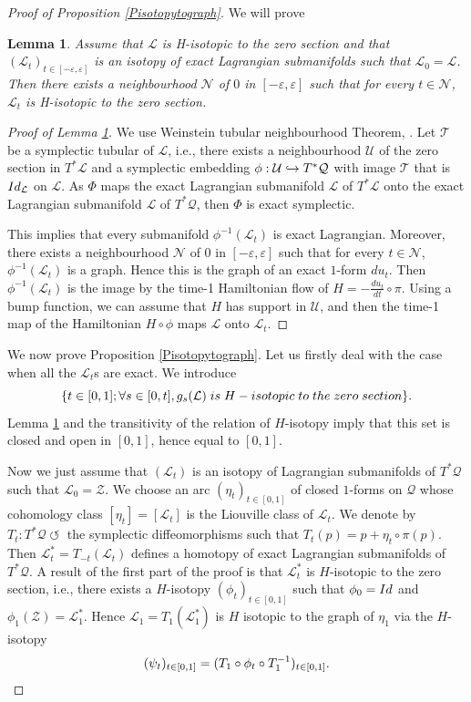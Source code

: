 \documentclass[11pt]{article}
\newcommand{\ie}{i.e.,\xspace}
\numberwithin{equation}{section}
\numberwithin{figure}{section}
\numberwithin{table}{section}
\def\hto{\mathrel{\lhook\joinrel\to}}
\providecommand{\righttoleftarrow}{\mathrel{\circlearrowleft}}
\newtheorem{lemma}{Lemma}
\theoremstyle{definition}
\def\cL{{\mathcal L}}
\def\cN{{\mathcal N}}
\def\cQ{{\mathcal Q}}
\def\cT{{\mathcal T}}
\def\cU{{\mathcal U}}
\def\cZ{{\mathcal Z}}
\begin{document}
\begin{proof}[Proof of Proposition \ref{Pisotopytograph}]
We will prove
\begin{lemma}\label{Lisotexactlagr}
Assume that $\cL$ is H-isotopic to the zero section and that $(\cL_t)_{t\in[-\varepsilon, \varepsilon]}$ is an isotopy of exact Lagrangian submanifolds such that $\cL_0=\cL$. Then there exists a neighbourhood $\cN$ of $0$ in $[-\varepsilon, \varepsilon]$ such that for every $t\in\cN$, $\cL_t$ is H-isotopic to the zero section.
\end{lemma}

\begin{proof}[Proof of Lemma \ref{Lisotexactlagr}]
We use Weinstein tubular neighbourhood Theorem, \cite{Weinstein1977}. Let $\cT$ be a symplectic tubular of $\cL$, \ie there exists a neighbourhood $\cU$ of the zero section in $T^*\cL$ and a symplectic embedding $\phi:\cU \hto T^*\cQ$ with image $\cT$ that is ${\rm Id}_{\cL}$ on $\cL$. As $\Phi$ maps the exact Lagrangian submanifold $\cL$ of $T^*\cL$ onto the exact Lagrangian submanifold $\cL$ of $T^*\cQ$, then $\Phi$ is exact symplectic.

This implies that every submanifold $\phi^{-1}(\cL_t)$ is exact Lagrangian. Moreover, there exists a neighbourhood $\cN$ of $0$ in $[-\varepsilon, \varepsilon]$ such that for every $t\in\cN$, $\phi^{-1}(\cL_t)$ is a graph. Hence this is the graph of an exact $1$-form $du_t$. Then $\phi^{-1}(\cL_t)$ is the image by the time-1 Hamiltonian flow of $H=-\frac{du_t}{dt}\circ \pi$. Using a bump function, we can assume that $H$ has support in $\cU$, and then the time-1 map of the Hamiltonian $H\circ\phi$ maps $\cL$ onto $\cL_t$.
\end{proof}

We now prove Proposition \ref{Pisotopytograph}. Let us firstly deal with the case when all the $\cL_t$s are exact. We introduce
\[
\{ t\in[0, 1]; \forall s\in [0, t], g_s(\cL)\;{\rm is}\; H-{\rm isotopic}\;{\rm to}\;{\rm the}\;{\rm zero}\;{\rm section}\}.
\]
Lemma \ref{Lisotexactlagr} and the transitivity of the relation of $H$-isotopy imply that this set is closed and open in $[0, 1]$, hence equal to $[0,1]$.

Now we just assume that $(\cL_t)$ is an isotopy of Lagrangian submanifolds of $T^*\cQ$ such that $\cL_0=\cZ$. We choose an arc $(\eta_t)_{t\in[0,1]}$ of closed $1$-forms on $\cQ$ whose cohomology class $[\eta_t]=[\cL_t]$ is the Liouville class of $\cL_t$. We denote by $T_t:T^*\cQ\righttoleftarrow$ the symplectic diffeomorphisms such that $T_t(p)=p+\eta_t\circ\pi (p)$. Then $\cL^*_t=T_{-t}(\cL_t)$ defines a homotopy of exact Lagrangian submanifolds of $T^*\cQ$. A result of the first part of the proof is that $\cL^*_t$ is $H$-isotopic to the zero section, \ie there exists a $H$-isotopy $(\phi_t)_{t\in[0, 1]}$ such that $\phi_0={\rm Id}$ and $\phi_1(\cZ)=\cL^*_1$. Hence $\cL_1=T_1(\cL^*_1)$ is $H$ isotopic to the graph of $\eta_1$ via the $H$-isotopy
\[
(\psi_t)_{t\in[0,1]}=(T_1\circ \phi_t\circ T_1^{-1})_{t\in[0, 1]}.\qedhere
\]
\end{proof}
\end{document}
